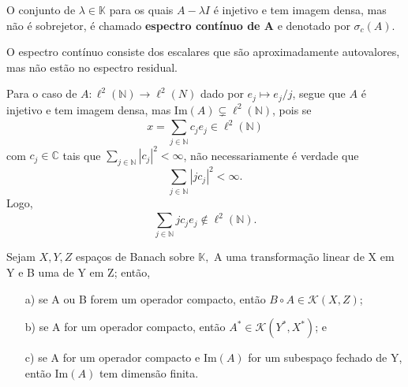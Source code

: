 \documentclass[../functional_analysis.tex]{subfiles}
\begin{document}
\begin{tcolorbox}[
		skin=enhanced,
		title=Lembrete!,
		after title={\hfill Espectro Contínuo},
		fonttitle=\bfseries,
		sharp corners=downhill,
		colframe=black,
		colbacktitle=yellow!75!white,
		colback=yellow!30,
		colbacklower=black,
		coltitle=black,
		drop large lifted shadow
	]
	O conjunto de \(\lambda\in \mathbb{K}\) para os quais \(A-\lambda I\) é injetivo e tem imagem densa, mas não é sobrejetor, é chamado \textbf{espectro contínuo de A}
	e denotado por \(\sigma_{c}(A)\).

	O espectro contínuo consiste dos escalares que são aproximadamente autovalores, mas não estão no espectro residual.

	Para o caso de \(A:\ell^{2}(\mathbb{N})\rightarrow \ell^{2}(N)\) dado por \(e_{j}\mapsto e_{j}/j\), segue que \(A\) é injetivo e tem imagem densa, mas \(\mathrm{Im}(A)\subsetneq \ell^{2}(\mathbb{N})\), pois se
	\[
		x=\sum\limits_{j\in \mathbb{N}}^{}c_{j}e_{j}\in \ell^{2}(\mathbb{N})
	\]
	com \(c_{j}\in \mathbb{C}\) tais que \(\sum\limits_{j\in \mathbb{N}}^{}| c_{j} |^{2}<\infty\), não necessariamente é verdade que
	\[
		\sum\limits_{j\in \mathbb{N}}^{}| jc_{j} |^{2}<\infty.
	\]
	Logo,
	\[
		\sum\limits_{j\in \mathbb{N}}^{}jc_{j}e_{j}\not\in \ell^{2}(\mathbb{N}).
	\]
\end{tcolorbox}
\begin{theorem*}
	Sejam \(X, Y, Z \) espaços de Banach sobre \(\mathbb{K},\) A uma transformação linear de X em Y e B uma de Y em Z; então,
	\begin{itemize}
		\item[a)] se A ou B forem um operador compacto, então \(B\circ A\in \mathcal{K}(X, Z)\);
		\item[b)] se A for um operador compacto, então \(A^{*}\in \mathcal{K}(Y^{*}, X^{*})\); e
		\item[c)] se A for um operador compacto e \(\mathrm{Im}(A)\) for um subespaço fechado de Y, então \(\mathrm{Im}(A)\) tem dimensão finita.
	\end{itemize}
\end{theorem*}
\end{document}
